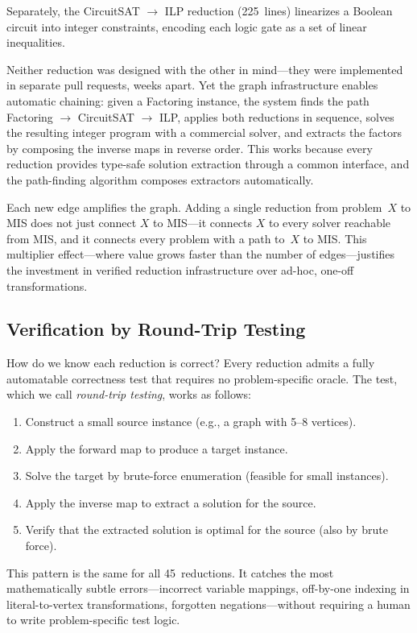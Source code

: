 \documentclass[conference]{IEEEtran}
\begin{document}
Separately, the CircuitSAT $\to$ ILP reduction (225~lines) linearizes a Boolean circuit into integer constraints, encoding each logic gate as a set of linear inequalities.

Neither reduction was designed with the other in mind---they were implemented in separate pull requests, weeks apart.
Yet the graph infrastructure enables automatic chaining: given a Factoring instance, the system finds the path Factoring $\to$ CircuitSAT $\to$ ILP, applies both reductions in sequence, solves the resulting integer program with a commercial solver, and extracts the factors by composing the inverse maps in reverse order.
This works because every reduction provides type-safe solution extraction through a common interface, and the path-finding algorithm composes extractors automatically.

Each new edge amplifies the graph.
Adding a single reduction from problem~$X$ to MIS does not just connect $X$ to MIS---it connects $X$ to every solver reachable from MIS, and it connects every problem with a path to~$X$ to MIS.
This multiplier effect---where value grows faster than the number of edges---justifies the investment in verified reduction infrastructure over ad-hoc, one-off transformations.

\subsection{Verification by Round-Trip Testing}\label{sec:roundtrip}

How do we know each reduction is correct?
Every reduction admits a fully automatable correctness test that requires no problem-specific oracle.
The test, which we call \emph{round-trip testing}, works as follows:

\begin{enumerate}
  \item Construct a small source instance (e.g., a graph with 5--8 vertices).
  \item Apply the forward map to produce a target instance.
  \item Solve the target by brute-force enumeration (feasible for small instances).
  \item Apply the inverse map to extract a solution for the source.
  \item Verify that the extracted solution is optimal for the source (also by brute force).
\end{enumerate}

This pattern is the same for all 45~reductions.
It catches the most mathematically subtle errors---incorrect variable mappings, off-by-one indexing in literal-to-vertex transformations, forgotten negations---without requiring a human to write problem-specific test logic.
\end{document}
